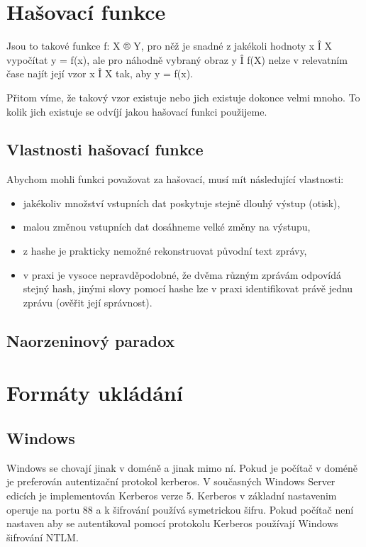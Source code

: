 \documentclass[thesis=B,czech]{FITthesis}[2019/12/23]
\begin{document}
\section{Hašovací funkce}

Jsou to takové funkce f: X ® Y, pro něž je snadné z jakékoli hodnoty x Î X vypočítat y = f(x), ale pro náhodně vybraný obraz y Î f(X) nelze v relevatním čase najít její vzor x Î X tak, aby y = f(x).

Přitom víme, že takový vzor existuje nebo jich existuje dokonce velmi mnoho. To kolik jich existuje se odvíjí jakou hašovací funkci použijeme.

\subsection{Vlastnosti hašovací funkce}

Abychom mohli funkci považovat za hašovací, musí mít následující vlastnosti:

\begin{itemize}
    \item jakékoliv množství vstupních dat poskytuje stejně dlouhý výstup (otisk),
    \item malou změnou vstupních dat dosáhneme velké změny na výstupu,
    \item z hashe je prakticky nemožné rekonstruovat původní text zprávy,
    \item v praxi je vysoce nepravděpodobné, že dvěma různým zprávám odpovídá stejný hash, jinými slovy pomocí hashe lze v praxi identifikovat právě jednu zprávu (ověřit její správnost).
\end{itemize}


\subsection{Naorzeninový paradox}

\section{Formáty ukládání}

\subsection{Windows}

Windows se chovají jinak v doméně a jinak mimo ní. Pokud je počítač v doméně je preferován autentizační protokol kerberos. V současných Windows Server edicích je implementován Kerberos verze 5. Kerberos v základní nastavenim operuje na portu 88 a k šifrování používá symetrickou šifru. 
Pokud počítač není nastaven aby se autentikoval pomocí protokolu Kerberos používají Windows šifrování NTLM.
\end{document}
